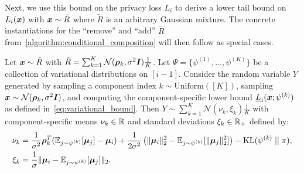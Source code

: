 Next, we use this bound on the privacy loss $L_i$ to derive a lower tail bound on $L_i({\bm{x}})$ with ${\bm{x}} \sim \tilde{R}$ where $\tilde{R}$ is an arbitrary Gaussian mixture.
The concrete instantiations for the ``remove'' and ``add'' $\tilde{R}$ from~\cref{algorithm:conditional_composition} will then follow as special cases.
\begin{lemma}\label{lemma:variational_distribution_general}
    Let ${\bm{x}} \sim \tilde{R}$ with $\tilde{R} = \sum_{k=1}^K \mathcal{N}({\bm{\rho}}_k, \sigma^2 {\bm{I}}) \frac{1}{K}$.
    Let $\Psi = \{\psi^{(1)}, \dots, \psi^{(K)}\}$ be a collection of variational distributions on $[i-1]$.
    Consider the random variable $Y$ generated by sampling a component index $k \sim \mathrm{Uniform}([K])$, sampling ${\bm{x}} \sim \mathcal{N}({\bm{\rho}}_k, \sigma^2 {\bm{I}})$, and computing the component-specific lower bound $\underline{L}_i({\bm{x}}; \psi^{(k)})$ as defined in~\cref{eq:variational_bound}.
    Then $Y \sim \sum_{k=1}^K \mathcal{N}(\nu_k, \xi_k) \frac{1}{K}$ with component-specific means $\nu_k \in {\mathbb{R}}$
    and standard deviations $\xi_k \in {\mathbb{R}}_+$ defined by:
    \begin{align*}
        \nu_k &= \frac{1}{\sigma^2} {\bm{\rho}}_k^T (\mathbb{E}_{j \sim \psi^{(k)}}[{\bm{\mu}}_j] - {\bm{\mu}}_i) + \frac{1}{2\sigma^2} \left( \|{\bm{\mu}}_i\|_2^2 - \mathbb{E}_{j \sim \psi^{(k)}}[\|{\bm{\mu}}_j\|_2^2] \right) - \mathrm{KL}(\psi^{(k)} \mid\mid \pi), \\
        \xi_k &= \frac{1}{\sigma} \| {\bm{\mu}}_i - \mathbb{E}_{j \sim \psi^{(k)}}[{\bm{\mu}}_j] \|_2.
    \end{align*}
\end{lemma}
